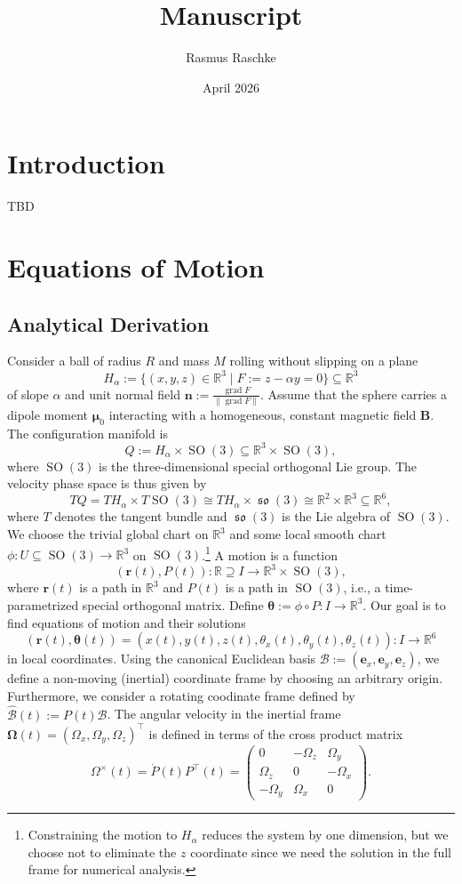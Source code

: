 \documentclass[12pt, letter paper]{article}
\title{Manuscript}
\author{Rasmus Raschke}
\date{April 2026}
\DeclareMathOperator{\SO}{SO}
\DeclareMathOperator{\so}{\mathfrak{so}}
\DeclareMathOperator{\grad}{grad}
\begin{document}
\section{Introduction}
TBD
\section{Equations of Motion}
\subsection{Analytical Derivation}
Consider a ball of radius $R$ and mass $M$ rolling without slipping on a plane
\begin{equation}
    \label{eq:hypersurface}
    H_\alpha := \{ (x,y,z) \in \mathbb{R}^3 \mid F:=z-\alpha y =0 \}\subseteq \mathbb{R}^3
\end{equation}
of slope $\alpha$ and unit normal field $\bm{n}:=\frac{\grad F}{\|\grad F\|}$.
Assume that the sphere carries a dipole moment $\bm{\mu}_0$ interacting with a homogeneous, constant magnetic field $\bm{B}$. The configuration manifold is \[
Q := H_\alpha \times \SO(3) \subseteq \mathbb{R}^3 \times \SO(3)
,\] where $\SO(3)$ is the three-dimensional special orthogonal Lie group. The velocity phase space is thus given by \[
TQ = TH_\alpha \times T\SO(3) \cong TH_\alpha \times \so(3) \cong \mathbb{R}^2 \times \mathbb{R}^3 \subseteq \mathbb{R}^6,
\] where $T$ denotes the tangent bundle and $\so(3)$ is the Lie algebra of $\SO(3)$. We choose the trivial global chart on $\mathbb{R}^3$ and some local smooth chart $\phi: U \subseteq \SO(3) \to \mathbb{R}^3$ on $\SO(3)$.\footnote{Constraining the motion to $H_\alpha$ reduces the system by one dimension, but we choose not to eliminate the $z$ coordinate since we need the solution in the full frame for numerical analysis.} A motion is a function \[
(\bm{r}(t), P(t)): \mathbb{R} \supseteq I \to \mathbb{R}^3 \times \SO(3),
\] where $\bm{r}(t)$ is a path in $\mathbb{R}^3$ and $P(t)$ is a path in $\SO(3)$, i.e., a time-parametrized special orthogonal matrix. Define $\bm{\theta}:= \phi \circ P: I \to \mathbb{R}^3$. Our goal is to find equations of motion and their solutions \[
(\bm{r}(t),\bm{\theta}(t))=(x(t),y(t),z(t),\theta_x(t),\theta_y(t),\theta_z(t)): I \to \mathbb{R}^6
\] in local coordinates. Using the canonical Euclidean basis $\mathcal{B}:=(\bm{e}_x,\bm{e}_y, \bm{e}_z)$, we define a non-moving (inertial) coordinate frame by choosing an arbitrary origin. Furthermore, we consider a rotating coodinate frame defined by $\hat{\mathcal{B}}(t):=P(t)\mathcal{B}$. The angular velocity in the inertial frame $\bm{\Omega}(t)=(\Omega_x, \Omega_y, \Omega_z)^\top$ is defined in terms of the cross product matrix $$\Omega^\times(t) = \dot{P}(t)P^\top(t) = 
\begin{pmatrix}
    0 & -\Omega_z & \Omega_y \\
    \Omega_z & 0 & -\Omega_x \\
    -\Omega_y & \Omega_x & 0
\end{pmatrix}
.$$ 
\end{document}
